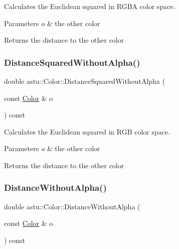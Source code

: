 Calculates the Euclidean squared in R\+G\+BA color space.


\begin{DoxyParams}{Parameters}
{\em o} & the other color \\
\hline
\end{DoxyParams}
\begin{DoxyReturn}{Returns}
the distance to the other color 
\end{DoxyReturn}
\mbox{\label{classastu_1_1Color_a04fc869504fd1f14d4c27d257ac0a121}} 
\subsubsection{\texorpdfstring{Distance\+Squared\+Without\+Alpha()}{DistanceSquaredWithoutAlpha()}}
{\footnotesize\ttfamily double astu\+::\+Color\+::\+Distance\+Squared\+Without\+Alpha (\begin{DoxyParamCaption}\item[{const \hyperlink{classastu_1_1Color}{Color} \&}]{o }\end{DoxyParamCaption}) const}

Calculates the Euclidean squared in R\+GB color space.


\begin{DoxyParams}{Parameters}
{\em o} & the other color \\
\hline
\end{DoxyParams}
\begin{DoxyReturn}{Returns}
the distance to the other color 
\end{DoxyReturn}
\mbox{\label{classastu_1_1Color_a2a897cfc4a5706a7c3ab8562adb217d8}} 
\subsubsection{\texorpdfstring{Distance\+Without\+Alpha()}{DistanceWithoutAlpha()}}
{\footnotesize\ttfamily double astu\+::\+Color\+::\+Distance\+Without\+Alpha (\begin{DoxyParamCaption}\item[{const \hyperlink{classastu_1_1Color}{Color} \&}]{o }\end{DoxyParamCaption}) const}

